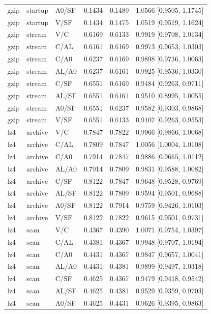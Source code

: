 \begin{longtable}{lllrrl}
gzip & startup & A0/SF & 0.1434 & 0.1489 & 1.0566 [0.9505, 1.1745] \\
gzip & startup & V/SF & 0.1434 & 0.1475 & 1.0519 [0.9519, 1.1624] \\
gzip & stream & V/C & 0.6169 & 0.6133 & 0.9919 [0.9708, 1.0134] \\
gzip & stream & C/AL & 0.6161 & 0.6169 & 0.9973 [0.9653, 1.0303] \\
gzip & stream & C/A0 & 0.6237 & 0.6169 & 0.9898 [0.9736, 1.0063] \\
gzip & stream & AL/A0 & 0.6237 & 0.6161 & 0.9925 [0.9536, 1.0330] \\
gzip & stream & C/SF & 0.6551 & 0.6169 & 0.9484 [0.9263, 0.9711] \\
gzip & stream & AL/SF & 0.6551 & 0.6161 & 0.9510 [0.8995, 1.0055] \\
gzip & stream & A0/SF & 0.6551 & 0.6237 & 0.9582 [0.9303, 0.9868] \\
gzip & stream & V/SF & 0.6551 & 0.6133 & 0.9407 [0.9263, 0.9553] \\
lz4 & archive & V/C & 0.7847 & 0.7822 & 0.9966 [0.9866, 1.0068] \\
lz4 & archive & C/AL & 0.7809 & 0.7847 & 1.0056 [1.0004, 1.0108] \\
lz4 & archive & C/A0 & 0.7914 & 0.7847 & 0.9886 [0.9665, 1.0112] \\
lz4 & archive & AL/A0 & 0.7914 & 0.7809 & 0.9831 [0.9588, 1.0082] \\
lz4 & archive & C/SF & 0.8122 & 0.7847 & 0.9648 [0.9528, 0.9769] \\
lz4 & archive & AL/SF & 0.8122 & 0.7809 & 0.9594 [0.9501, 0.9688] \\
lz4 & archive & A0/SF & 0.8122 & 0.7914 & 0.9759 [0.9426, 1.0103] \\
lz4 & archive & V/SF & 0.8122 & 0.7822 & 0.9615 [0.9501, 0.9731] \\
lz4 & scan & V/C & 0.4367 & 0.4390 & 1.0071 [0.9754, 1.0397] \\
lz4 & scan & C/AL & 0.4381 & 0.4367 & 0.9948 [0.9707, 1.0194] \\
lz4 & scan & C/A0 & 0.4431 & 0.4367 & 0.9847 [0.9657, 1.0041] \\
lz4 & scan & AL/A0 & 0.4431 & 0.4381 & 0.9899 [0.9497, 1.0318] \\
lz4 & scan & C/SF & 0.4625 & 0.4367 & 0.9479 [0.9418, 0.9542] \\
lz4 & scan & AL/SF & 0.4625 & 0.4381 & 0.9529 [0.9359, 0.9703] \\
lz4 & scan & A0/SF & 0.4625 & 0.4431 & 0.9626 [0.9395, 0.9863] \\

\end{longtable}
